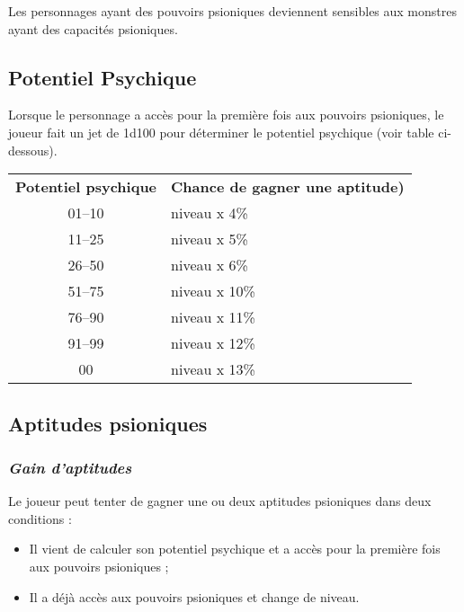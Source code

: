 \bigskip

Les personnages ayant des pouvoirs psioniques deviennent sensibles aux monstres ayant des capacités psioniques.

\subsection*{Potentiel Psychique}

Lorsque le personnage a accès pour la première fois aux pouvoirs psioniques, le joueur fait un jet de 1d100 pour déterminer le potentiel psychique (voir table ci-dessous).
\bigskip

{\parindent3cm\begin{tabular}{cl}
\textbf{Potentiel psychique} & \textbf{Chance de gagner une aptitude)} \\
01--10 & niveau x 4\% \\
11--25 & niveau x 5\% \\
26--50 & niveau x 6\% \\
51--75 & niveau x 10\% \\
76--90 & niveau x 11\% \\
91--99 & niveau x 12\% \\
\hspace{0.4cm}00 & niveau x 13\% \\
\end{tabular}}

\subsection*{Aptitudes psioniques}

\subsubsection*{\textit{Gain d'aptitudes}}
\label{aptitudes-gain}

Le joueur peut tenter de gagner une ou deux aptitudes psioniques dans deux conditions :

\bigskip

\begin{itemize}
\item Il vient de calculer son potentiel psychique et a accès pour la première fois aux pouvoirs psioniques ;
\item Il a déjà accès aux pouvoirs psioniques et change de niveau.
\end{itemize}

